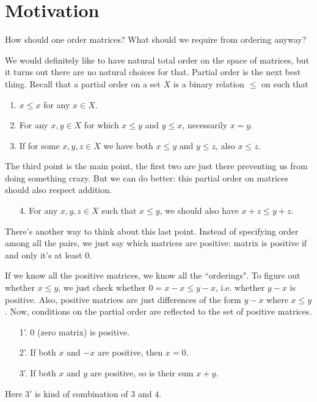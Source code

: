 \section{Motivation}

How should one order matrices? What should we require from ordering anyway?

We would definitely like to have natural total order on the space of matrices, but it turns out there are no natural choices for that. Partial order is the next best thing. Recall that a partial order on a set $X$ is a binary relation $\leq$ on such that
\begin{enumerate}
	\item $x \leq x$ for any $x \in X$.
	\item For any $x, y \in X$ for which $x \leq y$ and $y \leq x$, necessarily $x = y$.
	\item If for some $x, y, z \in X$ we have both $x \leq y$ and $y \leq z$, also $x \leq z$.
\end{enumerate}

The third point is the main point, the first two are just there preventing us from doing something crazy. But we can do better: this partial order on matrices should also respect addition.
\begin{enumerate}
\item[4.] For any $x, y, z \in X$ such that $x \leq y$, we should also have $x + z \leq y + z$.
\end{enumerate}

There's another way to think about this last point. Instead of specifying order among all the pairs, we just say which matrices are positive: matrix is positive if and only it's at least $0$.

If we know all the positive matrices, we know all the ``orderings". To figure out whether $x \leq y$, we just check whether $0 = x - x \leq y - x$, i.e. whether $y - x$ is positive. Also, positive matrices are just differences of the form $y - x$ where $x \leq y$. Now, conditions on the partial order are reflected to the set of positive matrices.
\begin{enumerate}
	\item[1'.] $0$ (zero matrix) is positive.
	\item[2'.] If both $x$ and $-x$ are positive, then $x = 0$.
	\item[3'.] If both $x$ and $y$ are positive, so is their sum $x + y$.
\end{enumerate}
Here $3'$ is kind of combination of $3$ and $4$.

